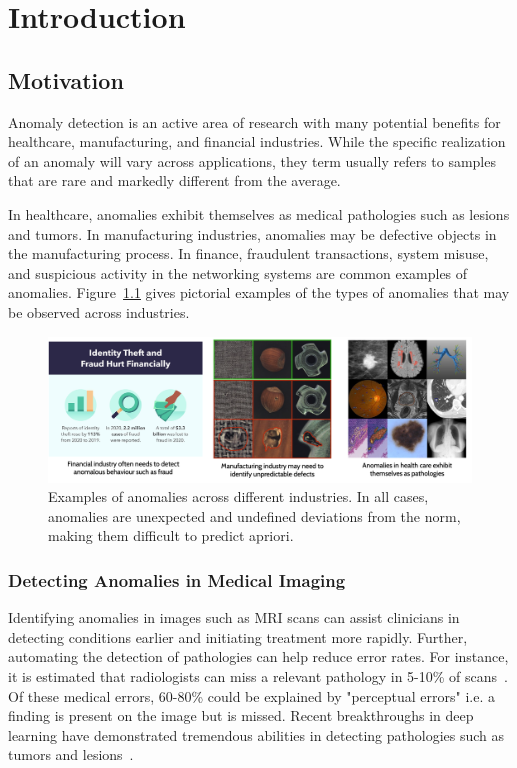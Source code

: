 \chapter{Introduction}

\section{Motivation}

Anomaly detection is an active area of research with many potential benefits for healthcare, manufacturing, and financial industries. While the specific realization of an anomaly will vary across applications, they term usually refers to samples that are rare and markedly different from the average.

In healthcare, anomalies exhibit themselves as medical pathologies such as lesions and tumors. In  manufacturing industries, anomalies may be defective objects in the manufacturing process. In finance, fraudulent transactions, system misuse, and suspicious activity in the networking systems are common examples of anomalies. Figure~\ref{fig:anoex} gives pictorial examples of the types of anomalies that may be observed across industries.

\begin{figure}[bhp]
\centering
    \centering
    \includegraphics[width=\textwidth]{figures/anomaly_examples.png}
    \caption{Examples of anomalies across different industries. In all cases, anomalies are unexpected and undefined deviations from the norm, making them difficult to predict apriori.}
    \label{fig:anoex}

\end{figure}%

\subsection*{Detecting Anomalies in Medical Imaging}

Identifying anomalies in images such as MRI scans can assist clinicians in detecting conditions earlier and initiating treatment more rapidly. Further, automating the detection of pathologies can help reduce error rates. For instance, it is estimated that radiologists can miss a relevant pathology in 5-10\% of scans~\cite{bruno_understanding_2015}. Of these medical errors, 60-80\% could be explained by "perceptual errors" i.e. a finding is present on the image but is missed. Recent breakthroughs in deep learning have demonstrated tremendous abilities in detecting pathologies such as tumors and lesions~\cite{kim_deep_2019,lee_deep_2017}.

